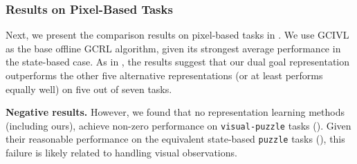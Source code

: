 \documentclass[final]{article} %
\theoremstyle{plain}
\theoremstyle{definition}
\theoremstyle{remark}
\renewcommand{\tt}[1]{\texttt{#1}}
\newcommand{\cutsubsectionup}{\vspace{-2pt}}
\newcommand{\cutsubsectiondown}{\vspace{-3pt}}
\begin{document}
\cutsubsectionup
\subsubsection{Results on Pixel-Based Tasks}
\cutsubsectiondown
\label{sec:exp_pixel}
Next, we present the comparison results on pixel-based tasks in .
We use GCIVL as the base offline GCRL algorithm,
given its strongest average performance in the state-based case.
As in ,
the results suggest that
our dual goal representation outperforms the other five alternative representations
(or at least performs equally well)
on five out of seven tasks.

\textbf{Negative results.}
However, we found that no representation learning methods (including ours),
achieve non-zero performance on \tt{visual-puzzle} tasks ().
Given their reasonable performance on the equivalent state-based \tt{puzzle} tasks (),
this failure is likely related to handling visual observations.
\end{document}
